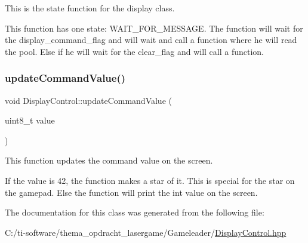 This is the state function for the display class. 

This function has one state\+: W\+A\+I\+T\+\_\+\+F\+O\+R\+\_\+\+M\+E\+S\+S\+A\+GE. The function will wait for the display\+\_\+command\+\_\+flag and will wait and call a function where he will read the pool. Else if he will wait for the clear\+\_\+flag and will call a function. \mbox{\label{class_display_control_ae2d8d0f502941d859639fd46ddd8924b}} 
\subsubsection{\texorpdfstring{update\+Command\+Value()}{updateCommandValue()}}
{\footnotesize\ttfamily void Display\+Control\+::update\+Command\+Value (\begin{DoxyParamCaption}\item[{uint8\+\_\+t}]{value }\end{DoxyParamCaption})\hspace{0.3cm}{\ttfamily [inline]}}



This function updates the command value on the screen. 

If the value is 42, the function makes a star of it. This is special for the star on the gamepad. Else the function will print the int value on the screen. 

The documentation for this class was generated from the following file\+:\begin{DoxyCompactItemize}
\item 
C\+:/ti-\/software/thema\+\_\+opdracht\+\_\+lasergame/\+Gameleader/\mbox{\hyperlink{_display_control_8hpp}{Display\+Control.\+hpp}}\end{DoxyCompactItemize}
